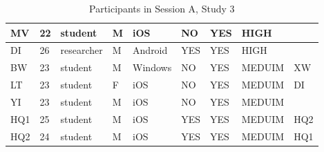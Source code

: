 \begin{table}[H]
{\begin{tabular}{|l|l|l|l|l|l|l|l|l|}
MV       & 22  & student    & M          & iOS                                                            & NO                                                                 & YES                                                                 & HIGH                                                        &                                                                   \\ \hline
DI       & 26  & researcher & M          & Android                                                        & YES                                                                & YES                                                                 & HIGH                                                        &                                                                   \\ \hline
BW       & 23  & student    & M          & Windows                                                        & NO                                                                 & YES                                                                 & MEDUIM                                                      & XW                                                                \\ \hline
LT       & 23  & student    & F          & iOS                                                            & NO                                                                 & YES                                                                 & MEDUIM                                                      & DI                                                                \\ \hline
YI       & 23  & student    & M          & iOS                                                            & NO                                                                 & YES                                                                 & MEDUIM                                                      &                                                                   \\ \hline
HQ1      & 25  & student    & M          & iOS                                                            & YES                                                                & YES                                                                 & MEDUIM                                                      & HQ2                                                               \\ \hline
HQ2      & 24  & student    & M          & iOS                                                            & YES                                                                & YES                                                                 & MEDUIM                                                      & HQ1                                                               \\ \hline
\end{tabular}}
\caption{Participants in Session A, Study 3}
\end{table}



